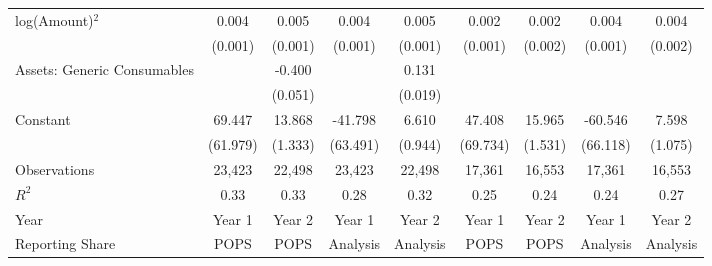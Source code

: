 {\begin{longtable}{l*{8}{c}}
log(Amount)$^{2}$   &       0.004\sym{***}&       0.005\sym{***}&       0.004\sym{***}&       0.005\sym{***}&       0.002         &       0.002         &       0.004\sym{**} &       0.004\sym{**} \\
                    &     (0.001)         &     (0.001)         &     (0.001)         &     (0.001)         &     (0.001)         &     (0.002)         &     (0.001)         &     (0.002)         \\
Assets: Generic Consumables&                     &      -0.400\sym{***}&                     &       0.131\sym{***}&                     &                     &                     &                     \\
                    &                     &     (0.051)         &                     &     (0.019)         &                     &                     &                     &                     \\
Constant            &      69.447         &      13.868\sym{***}&     -41.798         &       6.610\sym{***}&      47.408         &      15.965\sym{***}&     -60.546         &       7.598\sym{***}\\
                    &    (61.979)         &     (1.333)         &    (63.491)         &     (0.944)         &    (69.734)         &     (1.531)         &    (66.118)         &     (1.075)         \\
\midrule
Observations        &      23,423         &      22,498         &      23,423         &      22,498         &      17,361         &      16,553         &      17,361         &      16,553         \\
$ R^{2}$            &        0.33         &        0.33         &        0.28         &        0.32         &        0.25         &        0.24         &        0.24         &        0.27         \\
Year                &      Year 1         &      Year 2         &      Year 1         &      Year 2         &      Year 1         &      Year 2         &      Year 1         &      Year 2         \\
Reporting Share     &        POPS         &        POPS         &    Analysis         &    Analysis         &        POPS         &        POPS         &    Analysis         &    Analysis         \\
\bottomrule
\end{longtable}
}
